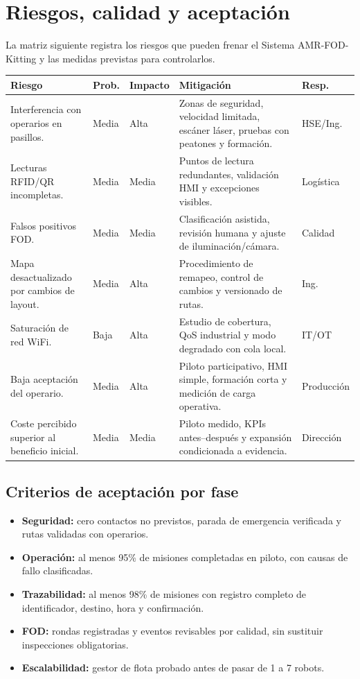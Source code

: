\chapter{Riesgos, calidad y aceptación}

La matriz siguiente registra los riesgos que pueden frenar el Sistema AMR-FOD-Kitting y las medidas previstas para controlarlos.

\begingroup
\small
\setlength{\tabcolsep}{3pt}
\begin{longtable}{@{}P{0.22\textwidth}P{0.08\textwidth}P{0.08\textwidth}P{0.38\textwidth}P{0.12\textwidth}@{}}
\toprule
\textbf{Riesgo} & \textbf{Prob.} & \textbf{Impacto} & \textbf{Mitigación} & \textbf{Resp.}\\
\midrule
\endhead
Interferencia con operarios en pasillos. & Media & Alta & Zonas de seguridad, velocidad limitada, escáner láser, pruebas con peatones y formación. & HSE/Ing.\\
Lecturas RFID/QR incompletas. & Media & Media & Puntos de lectura redundantes, validación HMI y excepciones visibles. & Logística\\
Falsos positivos FOD. & Media & Media & Clasificación asistida, revisión humana y ajuste de iluminación/cámara. & Calidad\\
Mapa desactualizado por cambios de layout. & Media & Alta & Procedimiento de remapeo, control de cambios y versionado de rutas. & Ing.\\
Saturación de red WiFi. & Baja & Alta & Estudio de cobertura, QoS industrial y modo degradado con cola local. & IT/OT\\
Baja aceptación del operario. & Media & Alta & Piloto participativo, HMI simple, formación corta y medición de carga operativa. & Producción\\
Coste percibido superior al beneficio inicial. & Media & Media & Piloto medido, KPIs antes--después y expansión condicionada a evidencia. & Dirección\\
\bottomrule
\end{longtable}
\endgroup

\section{Criterios de aceptación por fase}

\begin{itemize}
  \item \textbf{Seguridad:} cero contactos no previstos, parada de emergencia verificada y rutas validadas con operarios.
  \item \textbf{Operación:} al menos 95\% de misiones completadas en piloto, con causas de fallo clasificadas.
  \item \textbf{Trazabilidad:} al menos 98\% de misiones con registro completo de identificador, destino, hora y confirmación.
  \item \textbf{FOD:} rondas registradas y eventos revisables por calidad, sin sustituir inspecciones obligatorias.
  \item \textbf{Escalabilidad:} gestor de flota probado antes de pasar de 1 a 7 robots.
\end{itemize}

